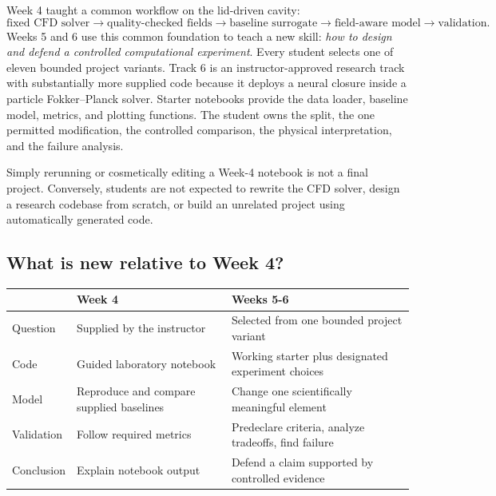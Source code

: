 \documentclass[11pt]{article}
\begin{document}
Week 4 taught a common workflow on the lid-driven cavity:
\[
\text{fixed CFD solver}\rightarrow\text{quality-checked fields}\rightarrow
\text{baseline surrogate}\rightarrow\text{field-aware model}\rightarrow\text{validation}.
\]
Weeks 5 and 6 use this common foundation to teach a new skill: \emph{how to design and defend a controlled computational experiment}. Every student selects one of eleven bounded project variants. Track 6 is an instructor-approved research track with substantially more supplied code because it deploys a neural closure inside a particle Fokker--Planck solver. Starter notebooks provide the data loader, baseline model, metrics, and plotting functions. The student owns the split, the one permitted modification, the controlled comparison, the physical interpretation, and the failure analysis.

\begin{warningbox}
Simply rerunning or cosmetically editing a Week-4 notebook is not a final project. Conversely, students are not expected to rewrite the CFD solver, design a research codebase from scratch, or build an unrelated project using automatically generated code.
\end{warningbox}

\subsection{What is new relative to Week 4?}
\begin{tabularx}{\textwidth}{@{}p{}YY@{}}
\toprule
& \textbf{Week 4} & \textbf{Weeks 5-6}\\
\midrule
Question & Supplied by the instructor & Selected from one bounded project variant\\
Code & Guided laboratory notebook & Working starter plus designated experiment choices\\
Model & Reproduce and compare supplied baselines & Change one scientifically meaningful element\\
Validation & Follow required metrics & Predeclare criteria, analyze tradeoffs, find failure\\
Conclusion & Explain notebook output & Defend a claim supported by controlled evidence\\
\bottomrule
\end{tabularx}
\end{document}
